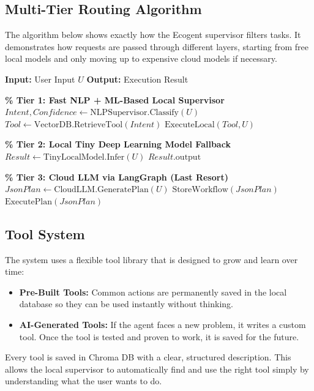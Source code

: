 \subsection{Multi-Tier Routing Algorithm}
The algorithm below shows exactly how the Ecogent supervisor filters tasks. It demonstrates how requests are passed through different layers, starting from free local models and only moving up to expensive cloud models if necessary.\\

\begin{algorithm}[H]
\caption{Multi-Tier Triage and Routing Logic}
\label{algo:multi_tier_routing}
\begin{algorithmic}[1]
    \State \textbf{Input:} User Input $U$
    \State \textbf{Output:} Execution Result
    
    \Statex \textbf{\% Tier 1: Fast NLP + ML-Based Local Supervisor}
    \State $Intent, Confidence \gets \text{NLPSupervisor.Classify}(U)$
        \State $Tool \gets \text{VectorDB.RetrieveTool}(Intent)$
            \State \Return $\text{ExecuteLocal}(Tool, U)$
        \EndIf
    \EndIf
    
    \Statex \textbf{\% Tier 2: Local Tiny Deep Learning Model Fallback}
    \State $Result \gets \text{TinyLocalModel.Infer}(U)$
        \State \Return $Result.\text{output}$
    \EndIf
    
    \Statex \textbf{\% Tier 3: Cloud LLM via LangGraph (Last Resort)}
    \State $JsonPlan \gets \text{CloudLLM.GeneratePlan}(U)$
    \State $\text{StoreWorkflow}(JsonPlan)$ 
    \State \Return $\text{ExecutePlan}(JsonPlan)$
\end{algorithmic}
\end{algorithm}

\subsection{Tool System}
The system uses a flexible tool library that is designed to grow and learn over time:
\begin{itemize}
    \item \textbf{Pre-Built Tools:} Common actions are permanently saved in the local database so they can be used instantly without thinking.
    \item \textbf{AI-Generated Tools:} If the agent faces a new problem, it writes a custom tool. Once the tool is tested and proven to work, it is saved for the future.
\end{itemize}
Every tool is saved in Chroma DB with a clear, structured description. This allows the local supervisor to automatically find and use the right tool simply by understanding what the user wants to do.\\


